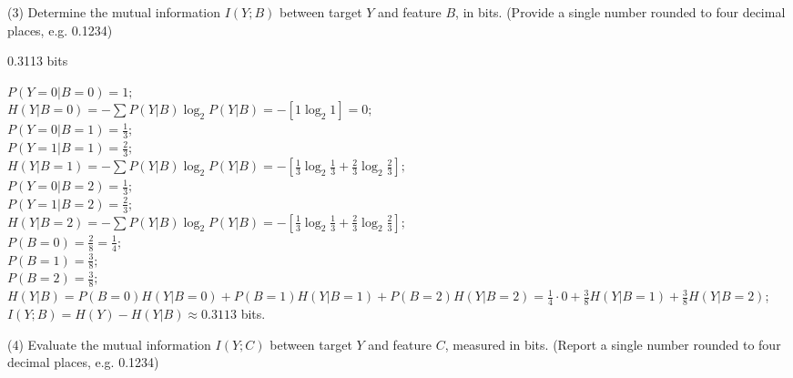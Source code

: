 \documentclass[11pt,addpoints,answers]{exam}
\begin{document}
\begin{questions}
		
		\item[(3)] Determine the mutual information \(I(Y; B)\) between target \(Y\) and feature \(B\), in bits. (Provide a single number rounded to four decimal places, e.g. 0.1234)
		
		\begin{minipage}[t]{0.25\textwidth}
			\begin{answer_box}[title=$I(Y;B)$,height=10cm]
				0.3113 bits
			\end{answer_box}
		\end{minipage}
		\begin{minipage}[t]{0.7\textwidth}
			\begin{answer_box}[title=Work,height=10cm]
				$P(Y=0|B=0)=1;$\\
				$H(Y|B=0)=-\sum P(Y|B) \log_2 P(Y|B) = -[1\log_2 1]=0;$\\
				$P(Y=0|B=1)=\frac13;$\\
				$P(Y=1|B=1)=\frac23;$\\
				$H(Y|B=1)=-\sum P(Y|B) \log_2 P(Y|B) = -[\frac13 \log_2 \frac13 + \frac23 \log_2 \frac23];$\\
				$P(Y=0|B=2)=\frac13;$\\
				$P(Y=1|B=2)=\frac23;$\\
				$H(Y|B=2)=-\sum P(Y|B) \log_2 P(Y|B) = -[\frac13 \log_2 \frac13 + \frac23 \log_2 \frac23];$\\
				$P(B=0)=\frac28=\frac14;$\\
				$P(B=1)=\frac38;$\\
				$P(B=2)=\frac38;$\\
				$H(Y|B)=P(B=0)H(Y|B=0)+P(B=1)H(Y|B=1)+P(B=2)H(Y|B=2)=\frac14 \cdot 0 + \frac38 H(Y|B=1) + \frac38 H(Y|B=2)$;\\
				$I(Y;B) = H(Y) - H(Y|B) \approx 0.3113$ bits. \\
			\end{answer_box}
		\end{minipage}
		
		
		\item[(4)] Evaluate the mutual information \(I(Y; C)\) between target \(Y\) and feature \(C\), measured in bits. (Report a single number rounded to four decimal places, e.g. 0.1234)
		

\end{questions}
\end{document}
